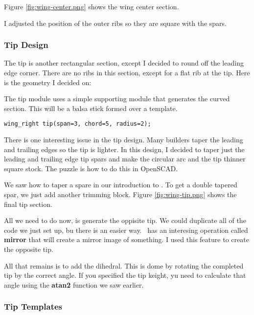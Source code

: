 Figure \ref{fig:wing-center.png} shows the wing center section.


I adjusted the position of the outer ribs so they are square with the spars.

\subsubsection{Tip Design}

The tip is another rectangular section, except I decided to round off the
leading edge corner. There are no ribs in this section, except for a flat rib
at the tip. Here is the geometry I decided on:


The tip module uses a simple supporting module that generates the curved section.
This will be a balsa stick formed over a template.

\begin{lstlisting}
wing_right tip(span=3, chord=5, radius=2);
\end{lstlisting}

There is one interesting issue in the tip design. Many builders taper the
leading and trailing edges so the tip is lighter. In this design, I decided to
taper just the leading and trailing edge tip spars and make the circular arc
and the tip thinner square stock. The puzzle is how to do this in OpenSCAD.

We saw how to taper a spare in our introduction to \osc. To get a double
tapered spar, we just add another trimming block.  Figure
\ref{fig:wing-tip.png} shows the final tip section.


All we need to do now, is generate the oppisite tip. We could duplicate all of
the code we just set up, bu there is an easier way. \osc\ has an interesing
operation called {\bf mirror} that will create a mirror image of something. I
used this feature to create the opposite tip.

All that remains is to add the dihedral. This is dome by rotating the completed
tip by the correct angle. If you specified the tip keight, yu need to calculate
that angle using the {\bf atan2} function we saw earlier.


\subsubsection{Tip Templates}

